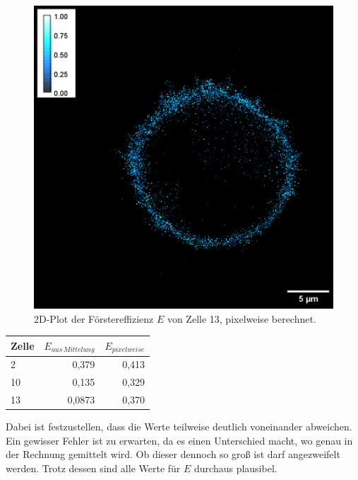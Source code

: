 \begin{figure}[h]
    \centering
    \includegraphics[scale = 0.45]{Bilder/E13.png}
    \caption{2D-Plot der Förstereffizienz $E$ von Zelle 13, pixelweise berechnet.}
    \label{bild:E13}
\end{figure}

\begin{center}
    \centering
    \begin{tabular}{l|r|r}
        Zelle & $E_{aus \, Mittelung}$ & $E_{pixelweise}$\\
        \hline
        2 & 0,379 & 0,413\\
        10 & 0,135 & 0,329\\
        13 & 0,0873 & 0,370\\
    \end{tabular}
    \label{tab:VerglE}
\end{center}

Dabei ist festzustellen, dass die Werte teilweise deutlich voneinander abweichen. Ein gewisser Fehler ist zu erwarten, da es einen Unterschied macht, wo 
genau in der Rechnung gemittelt wird. Ob dieser dennoch so groß ist darf angezweifelt werden. Trotz dessen sind alle Werte für $E$ durchaus 
plausibel.

\clearpage